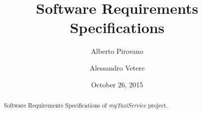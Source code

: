 \documentclass{article}      %
\title{Software Requirements Specifications}    %
\author{Alberto Pirovano \and Alessandro Vetere}      %
\date{October 26, 2015}      %
\newcommand{\myTaxiService}[0]{\emph{myTaxiService}}
\newcommand{\sectionBaseDir}[1]{./section_#1} %
\newcommand{\sectionTexPath}[1]{\sectionBaseDir{#1}/section_#1.tex}
\newcommand{\inputSection}[1]{\newpage}}
\begin{document}
\maketitle
\begin{abstract} %
	Software Requirements Specifications of \myTaxiService{} project.
\end{abstract} %
\newpage
\tableofcontents             %
\inputSection{1}
\inputSection{2}
\inputSection{3}
\end{document}
